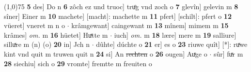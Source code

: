 \documentclass[8pt,a4paper,notitlepage]{article}
\begin{document}
\begin{table}[ht]
\begin{minipage}[t]{0.5\linewidth}
\newline
\line(1,0){75} \newline
\textbf{5} des] Do n \textbf{6} zôch ez und truoc] truͦg vnd zoch o \textbf{7} glevîn] gelevin m \textbf{8} sîner] Einer m \textbf{10} machete] [macht]: machette m \textbf{11} pfert] [schilt]: pfert o \textbf{12} vüeret] vneret m n o  $\cdot$ krâmgewant] caingewant m \textbf{13} mînem] mimem m \textbf{15} krâmes] \textit{om.} m \textbf{16} hüetet] Huͯtte m  $\cdot$ iuch] \textit{om.} m \textbf{18} lære] mere m \textbf{19} salliure] silluͯre m (n) (o) \textbf{20} in] Jch n  $\cdot$ dûhte] dúchte o \textbf{21} er] es o \textbf{23} riuwe quît] [*]: ruͯwe kint vnd quit m truwen quit n \textbf{24} si] An \sout{rechten} o \textbf{26} ougen] Auͯge o  $\cdot$ sûr] fuͯr m \textbf{28} siechiu] sich o \textbf{29} vromte] fremtte m freuiten o \newline
\end{minipage}
\end{table}
\newpage
\end{document}
